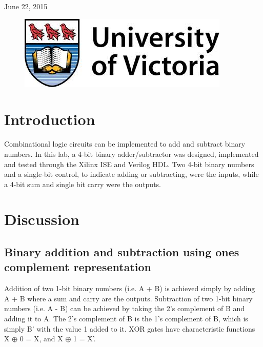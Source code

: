 \documentclass[11pt]{article}
\begin{document}
\begin{titlepage}
{\large June 22, 2015}\\ %

\begin{figure}[b]	 %
	\centering
	\includegraphics[scale=0.3]{UVic_logo}
\end{figure}

\end{titlepage}


\section{Introduction}

Combinational logic circuits can be implemented to add and subtract binary numbers. In this lab, a 4-bit binary adder/subtractor was designed, implemented and tested through the Xilinx ISE and Verilog HDL. Two 4-bit binary numbers and a single-bit control, to indicate adding or subtracting, were the inputs, while a 4-bit sum and single bit carry were the outputs. 

\section{Discussion}

\subsection{Binary addition and subtraction using ones complement representation}

Addition of two 1-bit binary numbers (i.e. A + B) is achieved simply by adding A + B where a sum and carry are the outputs. Subtraction of two 1-bit binary numbers (i.e. A - B) can be achieved by taking the 2's complement of B and adding it to A. The 2's complement of B is the 1's complement of B, which is simply B' with the value 1 added to it. XOR gates have characteristic functions X $\oplus$ 0 = X, and  X $\oplus$  1 = X'. 
\end{document}
